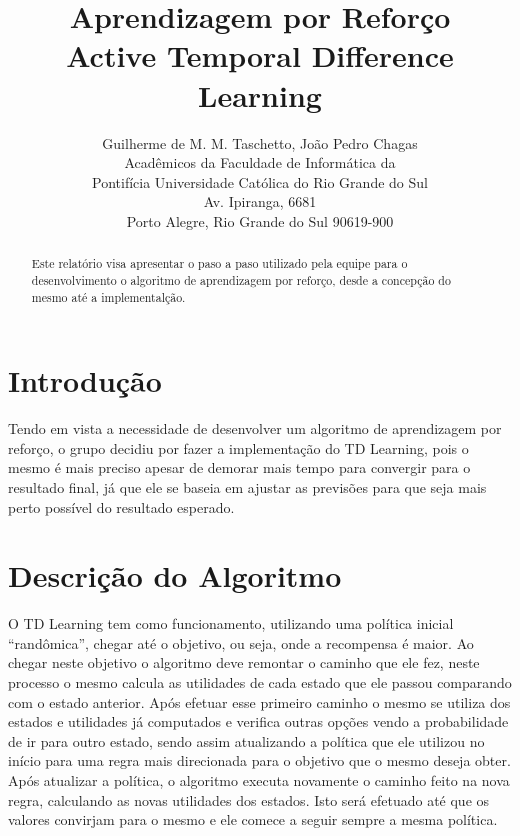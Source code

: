 \documentclass[letterpaper]{article}
\begin{document}
\title{Aprendizagem por Reforço\\Active Temporal Difference Learning}
\author{Guilherme de M. M. Taschetto, João Pedro Chagas\\
Acadêmicos da Faculdade de Informática da\\
Pontifícia Universidade Católica do Rio Grande do Sul\\
Av. Ipiranga, 6681\\
Porto Alegre, Rio Grande do Sul 90619-900}

\maketitle
\begin{abstract}
Este relatório visa apresentar o paso a paso utilizado pela equipe para o desenvolvimento o algoritmo de aprendizagem por
reforço, desde a concepção do mesmo até a implementalção.
\end{abstract}

\section{Introdução}

Tendo em vista a necessidade de desenvolver um algoritmo de aprendizagem por reforço, o grupo decidiu por fazer a implementação
do TD Learning, pois o mesmo é mais preciso apesar de demorar mais tempo para convergir para o resultado final, já que ele se baseia
em ajustar as previsões para que seja mais perto possível do resultado esperado.

\section{Descrição do Algoritmo}

O TD Learning tem como funcionamento, utilizando uma política inicial “randômica”, chegar até o objetivo, ou seja, onde a recompensa é
maior. Ao chegar neste objetivo o algoritmo deve remontar o caminho que ele fez, neste processo o mesmo calcula as utilidades de cada estado
que ele passou comparando com o estado anterior. Após efetuar esse primeiro caminho o mesmo se utiliza dos estados e utilidades já computados
e verifica outras opções vendo a probabilidade de ir para outro estado, sendo assim atualizando a política que ele utilizou no início para uma
regra mais direcionada para o objetivo que o mesmo deseja obter. Após atualizar a política, o algoritmo executa novamente o caminho feito na
nova regra, calculando as novas utilidades dos estados. Isto será efetuado até que os valores convirjam para o mesmo e ele comece a seguir
sempre a mesma política.
\end{document}
